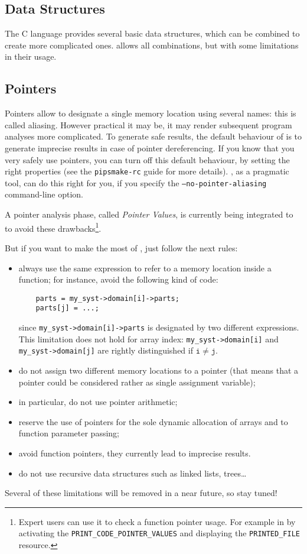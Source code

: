 \documentclass[a4paper]{article}
\begin{document}
\subsection{Data Structures}
\label{sec:data_structures}

The C language provides several basic data structures, which can be
combined to create more complicated ones. \Apips allows all combinations,
but with some limitations in their usage.


\subsection{Pointers}
\label{sec:pointers}

Pointers allow to designate a single memory location using several
names: this is called aliasing. However practical it may be, it may
render subsequent program analyses more complicated. To generate safe
results, the default behaviour of \Apips is to generate imprecise
results in case of pointer dereferencing. If you know that you very
safely use pointers, you can turn off this default behaviour, by
setting the right properties (see the \texttt{pipsmake-rc} guide for
more details). \Apfa, as a pragmatic tool, can do this right for you,
if you specify the \texttt{--no-pointer-aliasing} command-line option.

A pointer analysis phase, called \emph{Pointer Values}, is currently being
integrated to \Apips to avoid these drawbacks\footnote{Expert users can
  use it to check a function pointer usage. For example in \Apips by
  activating the \texttt{PRINT\_CODE\_POINTER\_VALUES} and displaying the
  \texttt{PRINTED\_FILE} resource.}.

But if you want to make the most of \Apfa, just follow the next rules:
\begin{itemize}
\item always use the same expression to refer to a memory location
  inside a function; for instance, avoid the following kind of code:
  \begin{lstlisting}
    parts = my_syst->domain[i]->parts;
    parts[j] = ...;
  \end{lstlisting}
  since \lstinline|my_syst->domain[i]->parts| is designated by two
  different expressions. This limitation does not hold for array
  index: \lstinline|my_syst->domain[i]| and
  \lstinline|my_syst->domain[j]| are rightly distinguished if
  $\mathtt{i} \neq \mathtt{j}$.
\item do not assign two different memory locations to a pointer (that
  means that a pointer could be considered rather as single assignment
  variable);
\item in particular, do not use pointer arithmetic;
\item reserve the use of pointers for the sole dynamic allocation of
  arrays and to function parameter passing;
\item avoid function pointers, they currently lead to imprecise results.
\item do not use recursive data structures such as linked lists, trees\ldots
\end{itemize}
Several of these limitations will be removed in a near future, so stay tuned!
\end{document}
